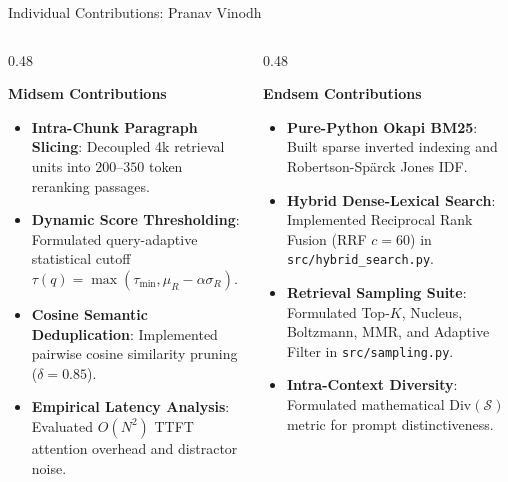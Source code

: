 \documentclass[10pt,aspectratio=169]{beamer}
\begin{document}
\begin{frame}{Individual Contributions: Pranav Vinodh}
    \begin{columns}[onlytextwidth,T]
        \begin{column}{0.48\textwidth}
            \begin{block}{\textbf{Midsem Contributions}}
                \footnotesize
                \begin{itemize}\setlength\itemsep{3pt}
                    \item \textbf{Intra-Chunk Paragraph Slicing}: Decoupled 4k retrieval units into $200$--$350$ token reranking passages.
                    \item \textbf{Dynamic Score Thresholding}: Formulated query-adaptive statistical cutoff $\tau(q) = \max(\tau_{\min}, \mu_R - \alpha \sigma_R)$.
                    \item \textbf{Cosine Semantic Deduplication}: Implemented pairwise cosine similarity pruning ($\delta = 0.85$).
                    \item \textbf{Empirical Latency Analysis}: Evaluated $O(N^2)$ TTFT attention overhead and distractor noise.
                \end{itemize}
            \end{block}
        \end{column}
        
        \begin{column}{0.48\textwidth}
            \begin{block}{\textbf{Endsem Contributions}}
                \footnotesize
                \begin{itemize}\setlength\itemsep{3pt}
                    \item \textbf{Pure-Python Okapi BM25}: Built sparse inverted indexing and Robertson-Spärck Jones IDF.
                    \item \textbf{Hybrid Dense-Lexical Search}: Implemented Reciprocal Rank Fusion (RRF $c=60$) in \texttt{src/hybrid\_search.py}.
                    \item \textbf{Retrieval Sampling Suite}: Formulated Top-$K$, Nucleus, Boltzmann, MMR, and Adaptive Filter in \texttt{src/sampling.py}.
                    \item \textbf{Intra-Context Diversity}: Formulated mathematical $\text{Div}(\mathcal{S})$ metric for prompt distinctiveness.
                \end{itemize}
            \end{block}
        \end{column}
    \end{columns}
\end{frame}
\end{document}
